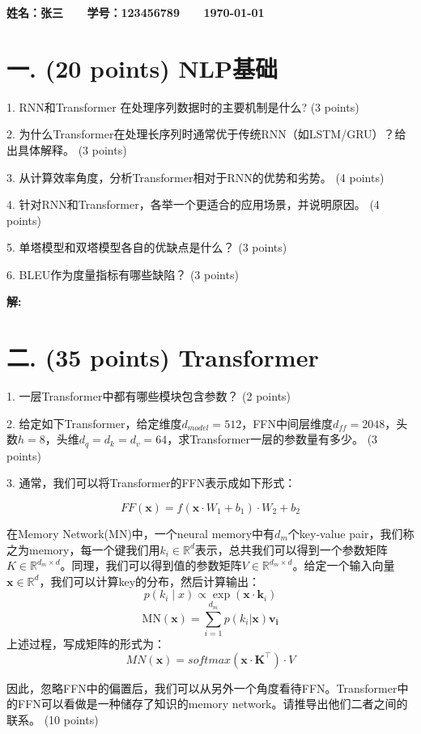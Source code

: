 \documentclass[8pt]{article}
\begin{document}
\textbf{\color{blue} \Large 姓名：张三 \ \ \ 学号：123456789 \ \ \ \today}


\section*{一. (20 points) NLP基础}
1. RNN和Transformer 在处理序列数据时的主要机制是什么? (3 points)

2. 为什么Transformer在处理长序列时通常优于传统RNN（如LSTM/GRU）？给出具体解释。 (3 points)

3. 从计算效率角度，分析Transformer相对于RNN的优势和劣势。 (4 points)

4. 针对RNN和Transformer，各举一个更适合的应用场景，并说明原因。 (4 points)

5. 单塔模型和双塔模型各自的优缺点是什么？ (3 points)

6. BLEU作为度量指标有哪些缺陷？ (3 points)

\textbf{\large 解:}
\vspace{15em}




\par


\section*{二. (35 points) Transformer}
1. 一层Transformer中都有哪些模块包含参数？ (2 points)

2. 给定如下Transformer，给定维度$d_{model}=512$，FFN中间层维度$d_{ff}=2048$，头数$h=8$，头维$d_q=d_k=d_v=64$，求Transformer一层的参数量有多少。 (3 points)

3. 通常，我们可以将Transformer的FFN表示成如下形式：

\[
FF(\mathbf{x})=f(\mathbf{x}\cdot W_1+b_1)\cdot W_2+b_2
\]

在Memory Network(MN)中，一个neural memory中有$d_m$个key-value pair，我们称之为memory，每一个键我们用$k_i\in\mathbb{R}^d$表示，总共我们可以得到一个参数矩阵$K\in\mathbb{R}^{d_m\times d}$。同理，我们可以得到值的参数矩阵$V\in\mathbb{R}^{d_m\times d}$。给定一个输入向量$\mathbf{x} \in \mathbb{R}^{d}$，我们可以计算key的分布，然后计算输出：
\[
p(k_i \mid x) \propto \exp(\mathbf{x}\cdot \mathbf{k}_i)
\]
\[
\text{MN}(\mathbf{x}) = \sum_{i=1}^{d_m}p(k_i|\mathbf{x})\mathbf{v_i}
\]
上述过程，写成矩阵的形式为：
\[
MN(\mathbf{x})=softmax(\mathbf{\mathbf{x} \cdot K^\top})\cdot V
\]

因此，忽略FFN中的偏置后，我们可以从另外一个角度看待FFN。Transformer中的FFN可以看做是一种储存了知识的memory network。请推导出他们二者之间的联系。 (10 points)
\end{document}
